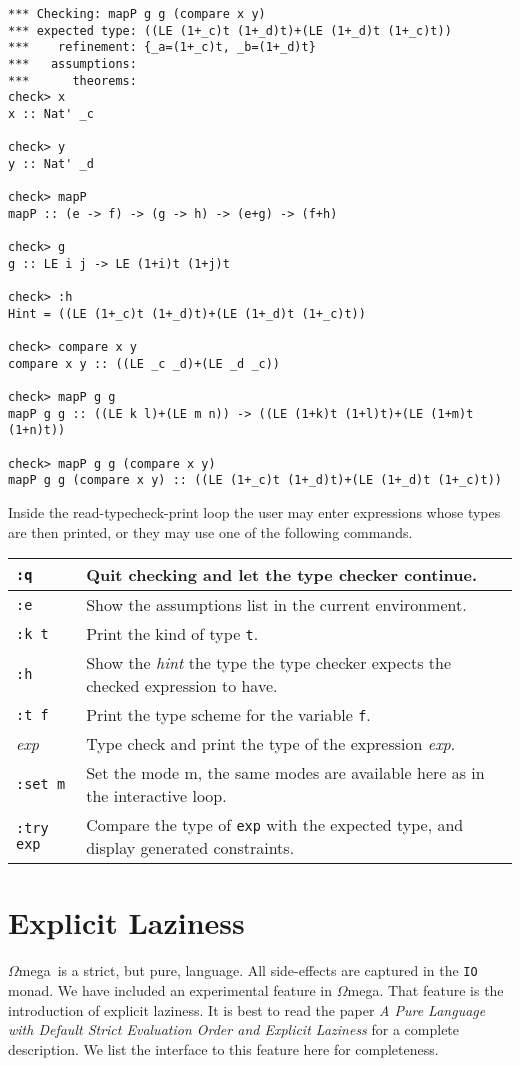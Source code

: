 \documentclass[11pt,twoside]{article}
\newcommand{\om}{$\Omega$mega}
\begin{document}
\begin{verbatim}
*** Checking: mapP g g (compare x y)
*** expected type: ((LE (1+_c)t (1+_d)t)+(LE (1+_d)t (1+_c)t))
***    refinement: {_a=(1+_c)t, _b=(1+_d)t}
***   assumptions:
***      theorems:
check> x
x :: Nat' _c

check> y
y :: Nat' _d

check> mapP
mapP :: (e -> f) -> (g -> h) -> (e+g) -> (f+h)

check> g
g :: LE i j -> LE (1+i)t (1+j)t

check> :h
Hint = ((LE (1+_c)t (1+_d)t)+(LE (1+_d)t (1+_c)t))

check> compare x y
compare x y :: ((LE _c _d)+(LE _d _c))

check> mapP g g
mapP g g :: ((LE k l)+(LE m n)) -> ((LE (1+k)t (1+l)t)+(LE (1+m)t (1+n)t))

check> mapP g g (compare x y)
mapP g g (compare x y) :: ((LE (1+_c)t (1+_d)t)+(LE (1+_d)t (1+_c)t))
\end{verbatim}
Inside the read-typecheck-print loop the user may enter expressions whose
types are then printed, or they may use one of the following commands.

\vspace*{.2in}

\begin{tabular}{|l|l|}\hline
{\tt :q} &  Quit checking and let the type checker continue. \\ \hline
{\tt :e} & Show the assumptions list in the current environment. \\ \hline
{\tt :k t} & Print the kind of type {\tt t}. \\ \hline
{\tt :h} & Show the {\em hint} the type the type checker expects the checked expression to have. \\ \hline
{\tt :t f} & Print the type scheme for the variable {\tt f}.\\ \hline
{\em exp} & Type check and print the type of the expression {\em exp}.\\ \hline
{\tt :set m} & Set the mode m, the same modes are available here as in the interactive loop. \\ \hline
{\tt :try exp} & Compare the type of {\tt exp} with the expected type, and display generated constraints. \\ \hline
\end{tabular}

\vspace*{.2in}

\section{Explicit Laziness} \label{lazy}
\om\ is a strict, but pure, language. All side-effects are captured
in the {\tt IO} monad. We have included an experimental feature in \om.
That feature is the introduction of explicit laziness. It is best
to read the paper 
{\em A Pure Language with Default Strict Evaluation Order and Explicit Laziness}\cite{SheardStrict}
for a complete description. We list the interface to this feature 
here for completeness.
\end{document}
